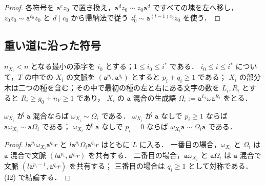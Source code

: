 \begin{proof}
各符号を $\mathtt a^ez_0$ で置き換え，$\mathtt a^dz_0\sim z_0\mathtt a^d$ ですべての塊を左へ移し，
$z_0z_0\sim\mathtt a^{c_0}z_0$ と $d\mid c_0$ から帰納法で従う $z_0^t\sim\mathtt a^{(t-1)c_0}z_0$ を使う．
\end{proof}

\subsection{重い道に沿った符号}

$n_{X_i}<n$ となる最小の添字を $i_0$ とする；$1\le i_0\le i^*$ である．
$i_0\le i\le i^*$ について，$T$ の中での $X_i$ の文脈を $(\mathtt a^{p_i},\mathtt a^{q_i})$ とすると $p_i+q_i\ge1$ である；
$X_i$ の部分木は二つの種を含む；その中で最初の種の左と右にある文字の数を $L_i,R_i$ とすると $R_i\ge g_0+n_Y\ge1$ であり，
$X_i$ の $\mathtt a$ 混合の生成語 $\Omega_i:=\mathtt a^{L_i}\omega\mathtt a^{R_i}$ をとる．

\begin{lemma}
\label{lem:app-h-borrow}
$\omega_{X_i}$ が $\mathtt a$ 混合ならば $\omega_{X_i}\sim\Omega_i$ である．
$\omega_{X_i}$ が $\mathtt a$ なしで $p_i\ge1$ ならば $\mathtt a\omega_{X_i}\sim\mathtt a\Omega_i$ である；
$\omega_{X_i}$ が $\mathtt a$ なしで $p_i=0$ ならば $\omega_{X_i}\mathtt a\sim\Omega_i\mathtt a$ である．
\end{lemma}

\begin{proof}
$l\mathtt a^{p_i}\omega_{X_i}\mathtt a^{q_i}r$ と $l\mathtt a^{p_i}\Omega_i\mathtt a^{q_i}r$ はともに $L$ に入る．
一番目の場合，$\omega_{X_i}$ と $\Omega_i$ は $\mathtt a$ 混合で文脈 $(l\mathtt a^{p_i},\mathtt a^{q_i}r)$ を共有する．
二番目の場合，$\mathtt a\omega_{X_i}$ と $\mathtt a\Omega_i$ は $\mathtt a$ 混合で文脈 $(l\mathtt a^{p_i-1},\mathtt a^{q_i}r)$ を共有する；
三番目の場合は $q_i\ge1$ として対称である．(I2) で結論する．
\end{proof}

